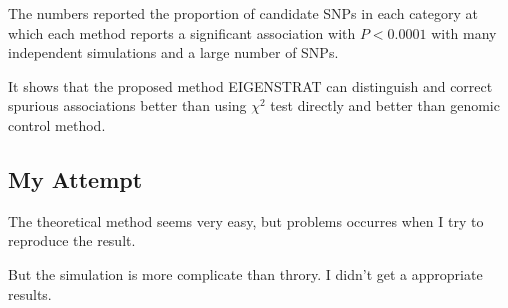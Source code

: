The numbers reported the proportion of candidate SNPs in each category at which each method reports a significant association with $P < 0.0001$ with many independent simulations and a large number of SNPs. 

It shows that the proposed method EIGENSTRAT can distinguish and correct spurious associations better than using $\chi^2$ test directly and better than genomic control method. 


\subsection{My Attempt}

The theoretical method seems very easy, but problems occurres when I try to reproduce the result.

But the simulation is more complicate than throry. 
I didn't get a appropriate results. 